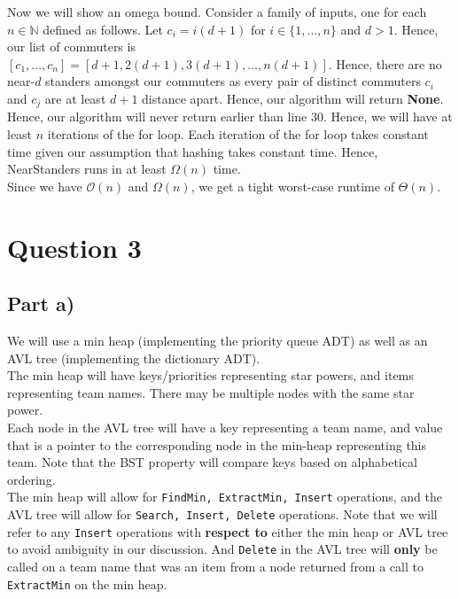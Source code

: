 \documentclass[12pt]{article}
\newcommand{\N}{\mathbb{N}}
\begin{document}
Now we will show an omega bound. Consider a family of inputs, one for each $n \in \N$ defined as follows. Let $c_i = i(d+1)$ for $i \in \{1,...,n\}$ and $d > 1$. Hence, our list of commuters is $[c_1,...,c_n] = [d+1, 2(d+1), 3(d+1),...,n(d+1)]$. Hence, there are no near-$d$ standers amongst our commuters as every pair of distinct commuters $c_i$ and $c_j$ are at least $d+1$ distance apart. Hence, our algorithm will return \textbf{None}. Hence, our algorithm will never return earlier than line 30. Hence, we will have at least $n$ iterations of the for loop. Each iteration of the for loop takes constant time given our assumption that hashing takes constant time. Hence, NearStanders runs in at least $\Omega(n)$ time. \\

Since we have $\mathcal{O}(n)$ and $\Omega(n)$, we get a tight worst-case runtime of $\Theta(n)$.

\newpage


\section*{Question 3}

\subsection*{Part a)}

We will use a min heap (implementing the priority queue ADT) as well as an AVL tree (implementing the dictionary ADT). \\

The min heap will have keys/priorities representing star powers, and items representing team names. There may be multiple nodes with the same star power. \\

Each node in the AVL tree will have a key representing a team name, and value that is a pointer to the corresponding node in the min-heap representing this team. Note that the BST property will compare keys based on alphabetical ordering. \\

The min heap will allow for \verb|FindMin, ExtractMin, Insert| operations, and the AVL tree will allow for \verb|Search, Insert, Delete| operations. Note that we will refer to any \verb|Insert| operations with \textbf{respect to} either the min heap or AVL tree to avoid ambiguity in our discussion. And \verb|Delete| in the AVL tree will \textbf{only} be called on a team name that was an item from a node returned from a call to \verb|ExtractMin| on the min heap. \\
\end{document}
